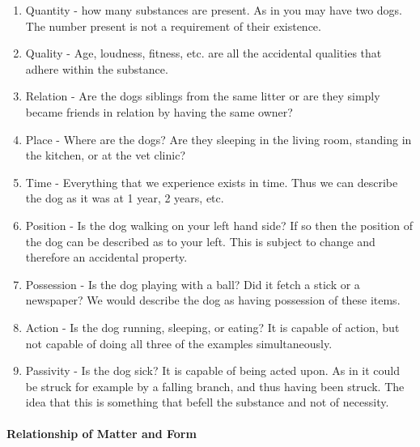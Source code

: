 \documentclass{ucetd}
\begin{document}
\begin{itemize}
    \begin{enumerate}
        \setcounter{enumi}{\value{categories}}
        \item Quantity - how many substances are present. As in you may have two dogs. The number present is not a requirement of their existence. 
        \item Quality - Age, loudness, fitness, etc. are all the accidental qualities that adhere within the substance.
        \item Relation - Are the dogs siblings from the same litter or are they simply became friends in relation by having the same owner?
        \item Place - Where are the dogs? Are they sleeping in the living room, standing in the kitchen, or at the vet clinic?
        \item Time - Everything that we experience exists in time. Thus we can describe the dog as it was at 1 year, 2 years, etc.
        \item Position - Is the dog walking on your left hand side? If so then the position of the dog can be described as to your left. This is subject to change and therefore an accidental property.
        \item Possession - Is the dog playing with a ball? Did it fetch a stick or a newspaper? We would describe the dog as having possession of these items.
        \item Action - Is the dog running, sleeping, or eating? It is capable of action, but not capable of doing all three of the examples simultaneously.
        \item Passivity - Is the dog sick? It is capable of being acted upon. As in it could be struck for example by a falling branch, and thus having been struck. The idea that this is something that befell the substance and not of necessity.
    \end{enumerate}
\end{itemize}
\paragraph{Relationship of Matter and Form}
\end{document}
